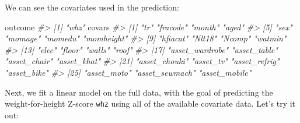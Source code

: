\documentclass[12pt, krantz2,]{krantz}
\newenvironment{Shaded}{\begin{snugshade}}{\end{snugshade}}
\newcommand{\CommentTok}[1]{\textcolor[rgb]{0.37,0.37,0.37}{\textit{#1}}}
\newcommand{\NormalTok}[1]{#1}
\theoremstyle{definition}
\theoremstyle{definition}
\theoremstyle{definition}
\newcommand{\1}{\mathbbm{1}}
\begin{document}
We can see the covariates used in the prediction:

\begin{Shaded}
\begin{Highlighting}[]
\NormalTok{outcome}
\CommentTok{#> [1] "whz"}
\NormalTok{covars}
\CommentTok{#>  [1] "tr"             "fracode"        "month"          "aged"          }
\CommentTok{#>  [5] "sex"            "momage"         "momedu"         "momheight"     }
\CommentTok{#>  [9] "hfiacat"        "Nlt18"          "Ncomp"          "watmin"        }
\CommentTok{#> [13] "elec"           "floor"          "walls"          "roof"          }
\CommentTok{#> [17] "asset_wardrobe" "asset_table"    "asset_chair"    "asset_khat"    }
\CommentTok{#> [21] "asset_chouki"   "asset_tv"       "asset_refrig"   "asset_bike"    }
\CommentTok{#> [25] "asset_moto"     "asset_sewmach"  "asset_mobile"}
\end{Highlighting}
\end{Shaded}

Next, we fit a linear model on the full data, with the goal of predicting the
weight-for-height Z-score \texttt{whz} using all of the available covariate data. Let's
try it out:
\end{document}
